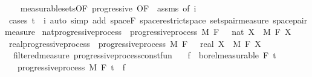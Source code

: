\begin{isabellebody}
%
\isadelimproof
\ \ %
\endisadelimproof
%
\isatagproof
{}\isamarkupfalse%
\ measurable{\isacharunderscore}{\kern0pt}sets{\isacharbrackleft}{\kern0pt}OF\ progressive{\isacharcomma}{\kern0pt}\ OF\ {\isacharunderscore}{\kern0pt}\ assms{\isacharcomma}{\kern0pt}\ of\ i{\isacharbrackright}{\kern0pt}\isanewline
\ \ \isamarkupfalse%
\ {\isacharparenleft}{\kern0pt}cases\ {\isachardoublequoteopen}t\ {\isasymle}\ i{\isachardoublequoteclose}{\isacharparenright}{\kern0pt}\ {\isacharparenleft}{\kern0pt}auto\ simp\ add{\isacharcolon}{\kern0pt}\ space{\isacharunderscore}{\kern0pt}F\ space{\isacharunderscore}{\kern0pt}restrict{\isacharunderscore}{\kern0pt}space\ sets{\isacharunderscore}{\kern0pt}pair{\isacharunderscore}{\kern0pt}measure\ space{\isacharunderscore}{\kern0pt}pair{\isacharunderscore}{\kern0pt}measure{\isacharparenright}{\kern0pt}%
\endisatagproof
{\isafoldproof}%
%
\isadelimproof
\isanewline
%
\endisadelimproof
\isanewline
{}\isamarkupfalse%
\isanewline
\isanewline
{}\isamarkupfalse%
\ nat{\isacharunderscore}{\kern0pt}progressive{\isacharunderscore}{\kern0pt}process\ {\isacharequal}{\kern0pt}\ progressive{\isacharunderscore}{\kern0pt}process\ M\ F\ {\isachardoublequoteopen}{}\ {\isacharcolon}{\kern0pt}{\isacharcolon}{\kern0pt}\ nat{\isachardoublequoteclose}\ X\ \ M\ F\ X\isanewline
{}\isamarkupfalse%
\ real{\isacharunderscore}{\kern0pt}progressive{\isacharunderscore}{\kern0pt}process\ {\isacharequal}{\kern0pt}\ progressive{\isacharunderscore}{\kern0pt}process\ M\ F\ {\isachardoublequoteopen}{}\ {\isacharcolon}{\kern0pt}{\isacharcolon}{\kern0pt}\ real{\isachardoublequoteclose}\ X\ \ M\ F\ X\isanewline
\isanewline
{}\isamarkupfalse%
\ {\isacharparenleft}{\kern0pt}\ filtered{\isacharunderscore}{\kern0pt}measure{\isacharparenright}{\kern0pt}\ progressive{\isacharunderscore}{\kern0pt}process{\isacharunderscore}{\kern0pt}const{\isacharunderscore}{\kern0pt}fun{\isacharcolon}{\kern0pt}\isanewline
\ \ \ {\isachardoublequoteopen}f\ {\isasymin}\ borel{\isacharunderscore}{\kern0pt}measurable\ {\isacharparenleft}{\kern0pt}F\ t\isanewline
\ \ \ {\isachardoublequoteopen}progressive{\isacharunderscore}{\kern0pt}process\ M\ F\ t\ {\isacharparenleft}{\kern0pt}{\isasymlambda}{\isacharunderscore}{\kern0pt}{\isachardot}{\kern0pt}\ f{\isacharparenright}{\kern0pt}{\isachardoublequoteclose}\isanewline

\end{isabellebody}
